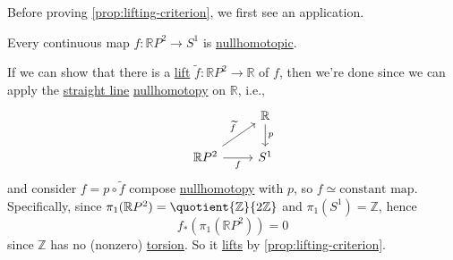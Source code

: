 Before proving \autoref{prop:lifting-criterion}, we first see an application.
\begin{eg}
	Every continuous map \(f\colon \mathbb{R} P^{2}\to S^1\) is \hyperref[def:nullhomotopic]{nullhomotopic}.
\end{eg}
\begin{explanation}
	If we can show that there is a \hyperref[def:lift]{lift} \(\widetilde{f} \colon \mathbb{R} P^{2}\to \mathbb{R}\) of \(f\),
	then we're done since we can apply the \hyperref[eg:lec1:straight-line-homotopy]{straight line} \hyperref[def:nullhomotopic]{nullhomotopy}
	on \(\mathbb{R} \), i.e.,
	\[
		\begin{tikzcd}
			& {\mathbb{R}} \\
			{\mathbb{R}P^2} & {S^1}
			\arrow["f"', from=2-1, to=2-2]
			\arrow["{\widetilde{f}}", from=2-1, to=1-2]
			\arrow["p", from=1-2, to=2-2]
		\end{tikzcd}
	\]
	and consider \(f = p \circ \widetilde{f} \) compose \hyperref[def:nullhomotopic]{nullhomotopy} with \(p\), so \(f\simeq \text{constant map} \).
	Specifically, since \(\pi _1(\mathbb{R} P^{2}) = \quotient{\mathbb{Z}}{2 \mathbb{Z}}\) and
	\(\pi _1(S^1) = \mathbb{Z} \), hence
	\[
		f_\ast (\pi _1(\mathbb{R} P^{2} )) = 0
	\]
	since \(\mathbb{Z} \) has no (nonzero) \hyperref[def:torsion-subgroup]{torsion}. So it \hyperref[prop:homotopy-lifting-property]{lifts} by
	\autoref{prop:lifting-criterion}.
\end{explanation}

